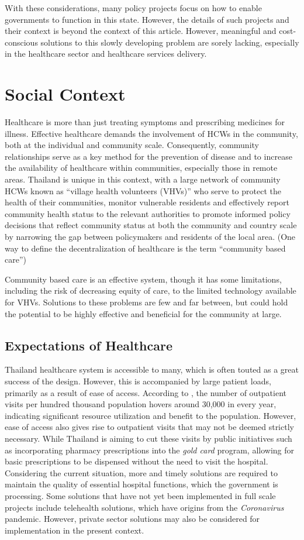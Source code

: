 \documentclass[10pt, a4paper, twocolumn]{article}
\begin{document}
With these considerations, many policy projects focus on how to enable governments to function in this state.
However, the details of such projects and their context is beyond the context of this article. However, meaningful and
cost-conscious solutions to this slowly developing problem are sorely lacking, especially in the healthcare sector and
healthcare services delivery.



\section{Social Context}
Healthcare is more than just treating symptoms and prescribing medicines for illness. Effective healthcare demands
the involvement of HCWs in the community, both at the individual and community scale. Consequently,
community relationships serve as a key method for the prevention of disease and to increase the availability of healthcare
within communities, especially those in remote areas. Thailand is unique in this context, with a large network of community
HCWs known as ``village health volunteers (VHVs)'' who serve to protect the health of their communities, monitor
vulnerable residents and effectively report community health status to the relevant authorities to promote informed policy
decisions that reflect community status at both the community and country scale by narrowing the gap between policymakers
and residents of the local area. (One way to define the decentralization of healthcare is the term ``community based care'')

Community based care is an effective system, though it has some limitations, including the risk of decreasing equity
of care, to the limited technology available for VHVs. Solutions to these problems are few and far between, but
could hold the potential to be highly effective and beneficial for the community at large.
\subsection{Expectations of Healthcare}
Thailand healthcare system is accessible to many, which is often touted as a great success of the design. However, this is
accompanied by large patient loads, primarily as a result of ease of access. According to \citet{MOHreport}, the number
of outpatient visits per hundred thousand population hovers around 30,000 in every year, indicating significant resource
utilization and benefit to the population. However, ease of access also gives rise to outpatient visits that may not be
deemed strictly necessary. While Thailand is aiming to cut these visits by public initiatives such as incorporating
pharmacy prescriptions into the \emph{gold card} program, allowing for basic prescriptions to be dispensed without the need
to visit the hospital. Considering the current situation, more and timely solutions are required to maintain the quality of
essential hospital functions, which the government is processing. Some solutions that have not yet been implemented in
full scale projects include telehealth solutions, which have origins from the \textit{Coronavirus} pandemic.
However, private sector solutions may also be considered for implementation in the present context.
\end{document}
